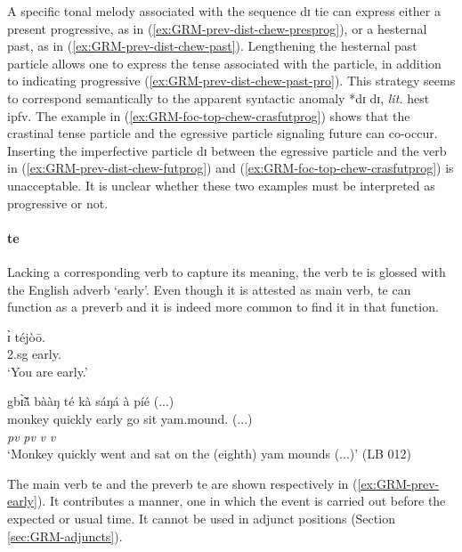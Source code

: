 \begin{exe}
\begin{exe}
\begin{exe}
{\begin{exe}
\begin{exe}
\begin{exe}
\begin{exe}
\begin{exe}
\begin{exe}
\begin{exe}
\begin{exe}
\begin{exe}
\begin{exe}
\begin{exe}
\begin{exe}
\begin{exe}
\begin{exe}
\begin{exe}
\begin{exe}
\begin{exe}
\begin{exe}
\begin{exe}
\begin{exe}
\z 
 \z 
 
 
A specific tonal melody associated with  the sequence {\sls dɪ tie} can express 
either a present progressive, as in (\ref{ex:GRM-prev-dist-chew-presprog}),  or 
a hesternal past, as in  (\ref{ex:GRM-prev-dist-chew-past}). Lengthening the 
hesternal past particle allows one to express the tense associated with the 
particle, in addition to indicating  progressive 
(\ref{ex:GRM-prev-dist-chew-past-pro}). This strategy seems to correspond 
semantically  to the apparent syntactic anomaly *{\sls dɪ dɪ},  {\it lit.} {\sc 
 hest} {\sc ipfv}.  The example in (\ref{ex:GRM-foc-top-chew-crasfutprog}) 
shows that the crastinal tense particle and the egressive particle signaling  
future  can co-occur.  Inserting the imperfective particle {\sls  dɪ} between 
the egressive particle and the verb in  (\ref{ex:GRM-prev-dist-chew-futprog}) 
and (\ref{ex:GRM-foc-top-chew-crasfutprog}) is  unacceptable. It is unclear 
whether these two examples must be interpreted as progressive or not.  



\paragraph{te}
\label{sec:GRM-preverb-te}

Lacking a corresponding verb to capture its meaning, the verb {\sls te} is 
glossed with the English adverb `early'. Even though  it is attested as main 
verb,  {\sls te} can  function  as a preverb and it is indeed more common to 
find 
it in that function. 


 \ea\label{ex:GRM-prev-early}
 \ea \gll  ɪ̀ téjòō.\\
  {\sc 2.sg} early.{\foc}\\
\glt  `You are early.'


\ex\label{GRM-prev-SVC-ka-1}
\glll gbɪ̃̀ã́     bààŋ   té   kà     sáŋá   à   
píé  {(...)}\\
monkey quickly   early   go  sit {\art}
yam.mound.{\pl}   {(...)}\\
{} {\it pv} {\it pv}  {\it v} {\it v} {}  {} {}\\
\glt `Monkey quickly went and sat on the (eighth) yam mounds (...)'  (LB 012)
\z
\z

The main verb {\sls te} and the preverb {\sls te} are shown respectively in  
(\ref{ex:GRM-prev-early}).  It contributes a manner, one in which the event is 
carried out before the expected or usual time.  It cannot be used  in adjunct 
positions (Section \ref{sec:GRM-adjuncts}).  



\end{exe}
\end{exe}
\end{exe}
\end{exe}
\end{exe}
\end{exe}
\end{exe}
\end{exe}
\end{exe}
\end{exe}
\end{exe}
\end{exe}
\end{exe}
\end{exe}
\end{exe}
\end{exe}
\end{exe}
\end{exe}
\end{exe}
\end{exe}}
\end{exe}
\end{exe}
\end{exe}
